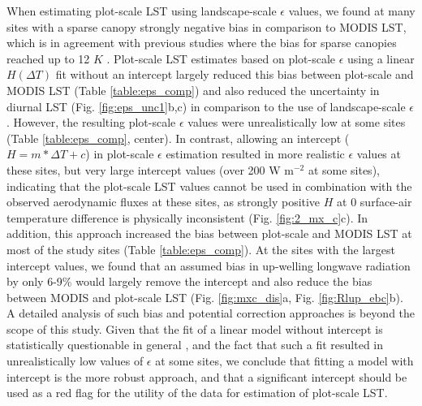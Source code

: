 \documentclass[fleqn,10pt]{wlscirep}
\begin{document}
{{ 
When estimating plot-scale LST using landscape-scale $\epsilon$ values, we found at many sites with a sparse canopy strongly negative bias in comparison to MODIS LST, which is in agreement with previous studies where the bias for sparse canopies reached up to 12 $K$ \cite{guillevic2018land}. Plot-scale LST estimates based on plot-scale $\epsilon$ using a linear $H(\Delta T)$ fit without an intercept largely reduced this bias between plot-scale and MODIS LST (Table \ref{table:eps_comp}) %
 and also reduced the uncertainty in diurnal LST (Fig. \ref{fig:eps_unc1}b,c) in comparison to the use of landscape-scale $\epsilon$. However, the resulting plot-scale $\epsilon$ values were unrealistically low at some sites (Table \ref{table:eps_comp}, center). In contrast, allowing an intercept ($H=m*\Delta T + c$) in plot-scale $\epsilon$ estimation resulted in more realistic $\epsilon$ values at these sites, but very large intercept values (over 200 W m$^{-2}$ at some sites), indicating that the plot-scale LST values cannot be used in combination with the observed aerodynamic fluxes at these sites, as strongly positive $H$ at 0 surface-air temperature difference is physically inconsistent (Fig. \ref{fig:2_mx_c}c). In addition, this approach increased the bias between plot-scale and MODIS LST at most of the study sites (Table \ref{table:eps_comp}). At the sites with the largest intercept values, we found that an assumed bias in up-welling longwave radiation by only 6-9\% would largely remove the intercept and also reduce the bias between MODIS and plot-scale LST (Fig. \ref{fig:mxc_dis}a, Fig. \ref{fig:Rlup_ebc}b). A detailed analysis of such bias and potential correction approaches is beyond the scope of this study. Given that the fit of a linear model without intercept is statistically questionable in general \cite{eisenhauer2003regression}, and the fact that such a fit resulted in unrealistically low values of $\epsilon$ at some sites, we conclude that fitting a model with intercept is the more robust approach, and that a significant intercept should be used as a red flag for the utility of the data for estimation of plot-scale LST. 

}}
\end{document}
